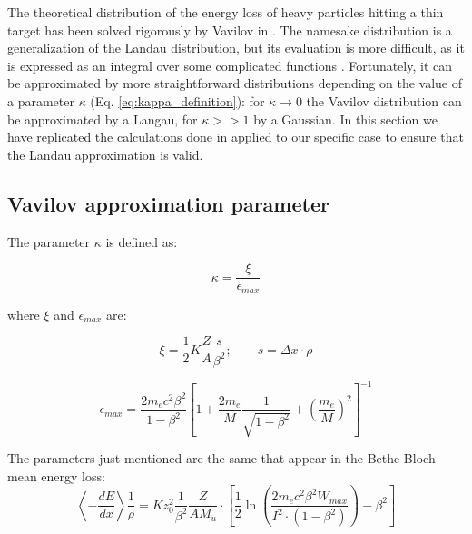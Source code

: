 
The theoretical distribution of the energy loss of heavy particles hitting a thin target has been solved rigorously by Vavilov in \cite{vavilov_1957}. The namesake distribution is a generalization of the Landau distribution, but its evaluation is more difficult, as it is expressed as an integral over some complicated functions \cite[Eq.(4)]{vavilov_1957}. Fortunately, it can be approximated by more straightforward distributions depending on the value of a parameter $\kappa$ (Eq. \eqref{eq:kappa_definition}): for $\kappa\rightarrow0$ the Vavilov distribution can be approximated by a Langau, for $\kappa>>1$ by a Gaussian. 
In this section we have replicated the calculations done in \cite{NAP20066} applied to our specific case to ensure that the Landau approximation is valid.

\subsection{Vavilov approximation parameter} %

The parameter \(\kappa\) is defined as:

\begin{equation}\label{eq:kappa_definition}
    \kappa = \frac{\xi}{\epsilon_{max}}
\end{equation}

where $\xi$ and $\epsilon_{max}$ \cite[Eq.(1)]{NAP20066} are:

\begin{equation*}
    \xi = \frac{1}{2} K \frac{Z}{A} \frac{s} {\beta^2}; \qquad s = \Delta x \cdot \rho
\end{equation*}

\begin{equation*}
\epsilon_{max} = \frac{2m_e c^2 \beta^2}{1-\beta^2}\left[ 1 + \frac{2m_e}{M}\frac{1}{\sqrt{1-\beta^2}} + \left(\frac{m_e}{M}\right)^2 \right]^{-1}
\end{equation*}


The parameters just mentioned are the same that appear in the Bethe-Bloch mean energy loss:
\begin{equation*}
    \left\langle-\frac{dE}{dx} \right\rangle \frac{1}{\rho} =  K z_0^2 \frac{1}{\beta^2} \frac{Z}{A M_u} \cdot\left[\frac{1}{2}\ln \left(\frac{2m_e c^2 \beta^2 W_{max}}{I^2 \cdot (1-\beta^2)}\right) - \beta^2\right]
\end{equation*}

